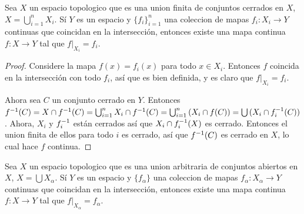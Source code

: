 \begin{lemma}\label{lemma_5.7}
    Sea $X$ un espacio topologico que es una union finita de conjuntos
    cerrados en $X$, $X=\bigcup_{i=1}^n{X_i}$. S\'i $Y$ es un espacio y
    $\{f_i\}_{i=1}^n$ una coleccion de mapas $f_i:X_i \xrightarrow{} Y$
    continuas que coincidan en la intersecci\'on, entonces existe una mapa
    continua $f:X \xrightarrow{} Y$ tal que $f|_{X_i}=f_i$.
\end{lemma}
\begin{proof}
    Considere la mapa $f(x)=f_i(x)$ para todo $x \in X_i$. Entonces $f$ coincida
    en la intersecci\'on con todo $f_i$, as\'i que es bien definida, y es claro
    que $f|_{X_i}=f_i$.

    Ahora sea $C$ un conjunto cerrado en  $Y$. Entonces  $f^{-1}(C)=X \cap
    f^{-1}(C)=\bigcup_{i=1}^n{X_i} \cap f^{-1}(C)=\bigcup_{i=1}^n{(X_i \cap
    f(C))}=\bigcup{(X_i \cap f_i^{-1}(C))}$. Ahora, $X_i$ y $f_i^{-1}$ est\'an
    cerrados as\'i que  $X_i \cap f_i^{-1}(X)$ es cerrado. Entonces el union
    finita de ellos para todo $i$ es cerrado, as\'i que $f^{-1}(C)$ es cerrado
    en $X$, lo cual hace  $f$ continua.
\end{proof}

\begin{lemma}\label{lemma_5.8}
    Sea $X$ un espacio topologico que es una union arbitraria de conjuntos
    abiertos en $X$, $X=\bigcup{X_\alpha}$. S\'i $Y$ es un espacio y
    $\{f_\alpha\}$ una coleccion de mapas $f_\alpha:X_\alpha \xrightarrow{} Y$
    continuas que coincidan en la intersecci\'on, entonces existe una mapa
    continua $f:X \xrightarrow{} Y$ tal que $f|_{X_\alpha}=f_\alpha$.
\end{lemma}

